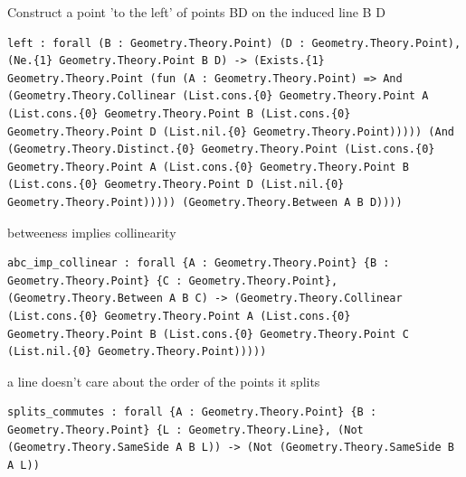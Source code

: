 \begin{theorem}
  \label{Geometry.Theory.B2.left}
  \leanok
  Construct a point 'to the left' of points BD on the induced line B D 
\begin{verbatim}left : forall (B : Geometry.Theory.Point) (D : Geometry.Theory.Point), (Ne.{1} Geometry.Theory.Point B D) -> (Exists.{1} Geometry.Theory.Point (fun (A : Geometry.Theory.Point) => And (Geometry.Theory.Collinear (List.cons.{0} Geometry.Theory.Point A (List.cons.{0} Geometry.Theory.Point B (List.cons.{0} Geometry.Theory.Point D (List.nil.{0} Geometry.Theory.Point))))) (And (Geometry.Theory.Distinct.{0} Geometry.Theory.Point (List.cons.{0} Geometry.Theory.Point A (List.cons.{0} Geometry.Theory.Point B (List.cons.{0} Geometry.Theory.Point D (List.nil.{0} Geometry.Theory.Point))))) (Geometry.Theory.Between A B D))))\end{verbatim}
\end{theorem}


\begin{theorem}
  \label{Geometry.Theory.Betweenness.abc_imp_collinear}
  \leanok
  betweeness implies collinearity 
\begin{verbatim}abc_imp_collinear : forall {A : Geometry.Theory.Point} {B : Geometry.Theory.Point} {C : Geometry.Theory.Point}, (Geometry.Theory.Between A B C) -> (Geometry.Theory.Collinear (List.cons.{0} Geometry.Theory.Point A (List.cons.{0} Geometry.Theory.Point B (List.cons.{0} Geometry.Theory.Point C (List.nil.{0} Geometry.Theory.Point)))))\end{verbatim}
\end{theorem}

\begin{theorem}
  \label{Geometry.Theory.Betweenness.splits_commutes}
  \leanok
  a line doesn't care about the order of the points it splits 
\begin{verbatim}splits_commutes : forall {A : Geometry.Theory.Point} {B : Geometry.Theory.Point} {L : Geometry.Theory.Line}, (Not (Geometry.Theory.SameSide A B L)) -> (Not (Geometry.Theory.SameSide B A L))\end{verbatim}
\end{theorem}


